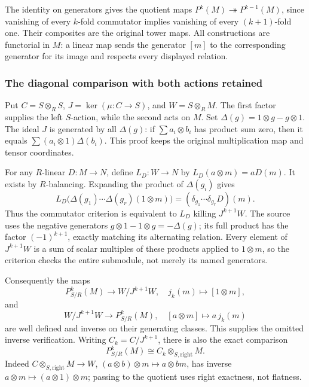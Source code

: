 The identity on generators gives the quotient maps \(P^k(M)\twoheadrightarrow P^{k-1}(M)\), since vanishing of every \(k\)-fold commutator implies vanishing of every \((k+1)\)-fold one. Their composites are the original tower maps. All constructions are functorial in \(M\): a linear map sends the generator \([m]\) to the corresponding generator for its image and respects every displayed relation.

\subsubsection{The diagonal comparison with both actions retained}\label{algebra-proof-043-the-diagonal-comparison-with-both-actions-retained}

Put \(C=S\otimes_R S\), \(J=\ker(\mu:C\to S)\), and \(W=S\otimes_R M\). The first factor supplies the left \(S\)-action, while the second acts on \(M\). Set \(\Delta(g)=1\otimes g-g\otimes1\). The ideal \(J\) is generated by all \(\Delta(g)\): if \(\sum a_i\otimes b_i\) has product sum zero, then it equals \(\sum(a_i\otimes1)\Delta(b_i)\). This proof keeps the original multiplication map and tensor coordinates.

For any \(R\)-linear \(D:M\to N\), define \(L_D:W\to N\) by \(L_D(a\otimes m)=aD(m)\). It exists by \(R\)-balancing. Expanding the product of \(\Delta(g_i)\) gives \[
L_D\bigl(\Delta(g_1)\cdots\Delta(g_r)(1\otimes m)\bigr)
=(\delta_{g_1}\cdots\delta_{g_r}D)(m).
\] Thus the commutator criterion is equivalent to \(L_D\) killing \(J^{k+1}W\). The source uses the negative generators \(g\otimes1-1\otimes g=-\Delta(g)\); its full product has the factor \((-1)^{k+1}\), exactly matching its alternating relation. Every element of \(J^{k+1}W\) is a sum of scalar multiples of these products applied to \(1\otimes m\), so the criterion checks the entire submodule, not merely its named generators.

Consequently the maps \[
P^k_{S/R}(M)\longrightarrow W/J^{k+1}W,\quad j_k(m)\longmapsto[1\otimes m],
\] and \[
W/J^{k+1}W\longrightarrow P^k_{S/R}(M),\quad[a\otimes m]\longmapsto a\,j_k(m)
\] are well defined and inverse on their generating classes. This supplies the omitted inverse verification. Writing \(C_k=C/J^{k+1}\), there is also the exact comparison \[
P^k_{S/R}(M)\cong C_k\otimes_{S,\mathrm{right}}M.
\] Indeed \(C\otimes_{S,\mathrm{right}}M\to W\), \((a\otimes b)\otimes m\mapsto a\otimes bm\), has inverse \(a\otimes m\mapsto(a\otimes1)\otimes m\); passing to the quotient uses right exactness, not flatness.

